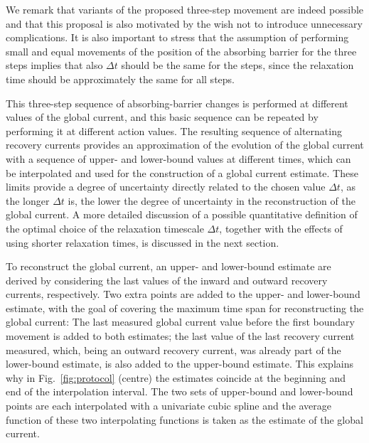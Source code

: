 {We remark that variants of the proposed three-step movement are indeed possible and that this proposal is also motivated by the wish not to introduce unnecessary complications. It is also important to stress that the assumption of performing small and equal movements of the position of the absorbing barrier for the three steps implies that also $\Delta t$ should be the same for the steps, since the relaxation time should be approximately the same for all steps. 

This three-step sequence of absorbing-barrier changes is performed at different values of the global current, and this basic sequence can be repeated by performing it at different action values. The resulting sequence of alternating recovery currents provides an approximation of the evolution of the global current with a sequence of upper- and lower-bound values at different times, which can be interpolated and used for the construction of a global current estimate. These limits provide a degree of uncertainty directly related to the chosen value $\Delta t$, as the longer $\Delta t$ is, the lower the degree of uncertainty in the reconstruction of the global current. A more detailed discussion of a possible quantitative definition of the optimal choice of the relaxation timescale $\Delta t$, together with the effects of using shorter relaxation times, is discussed in the next section.

To reconstruct the global current, an upper- and lower-bound estimate are derived by considering the last values of the inward and outward recovery currents, respectively. Two extra points are added to the upper- and lower-bound estimate, with the goal of covering the maximum time span for reconstructing the global current: The last measured global current value before the first boundary movement is added to both estimates; the last value of the last recovery current measured, which, being an outward recovery current, was already part of the lower-bound estimate, is also added to the upper-bound estimate. This explains why in Fig.~\ref{fig:protocol} (centre) the estimates coincide at the beginning and end of the interpolation interval. The two sets of upper-bound and lower-bound points are each interpolated with a univariate cubic spline and the average function of these two interpolating functions is taken as the estimate of the global current. 

}
